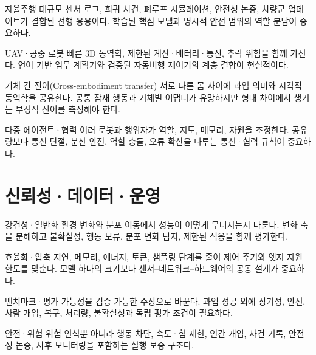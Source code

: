 \documentclass[11pt,openany]{book}
\begin{document}
\begin{termcard}{자율주행}
대규모 센서 로그, 희귀 사건, 폐루프 시뮬레이션, 안전성 논증, 차량군 업데이트가 결합된 선행 응용이다. 학습된 핵심 모델과 명시적 안전 범위의 역할 분담이 중요하다.
\end{termcard}

\begin{termcard}{UAV·공중 로봇}
빠른 3D 동역학, 제한된 계산·배터리·통신, 추락 위험을 함께 가진다. 언어 기반 임무 계획기와 검증된 자동비행 제어기의 계층 결합이 현실적이다.
\end{termcard}

\begin{termcard}{기체 간 전이(Cross-embodiment transfer)}
서로 다른 몸 사이에 과업 의미와 시각적 동역학을 공유한다. 공통 잠재 행동과 기체별 어댑터가 유망하지만 형태 차이에서 생기는 부정적 전이를 측정해야 한다.
\end{termcard}

\begin{termcard}{다중 에이전트·협력}
여러 로봇과 행위자가 역할, 지도, 메모리, 자원을 조정한다. 공유량보다 통신 단절, 분산 안전, 역할 충돌, 오류 확산을 다루는 통신·협력 규칙이 중요하다.
\end{termcard}

\chapter*{신뢰성·데이터·운영}

\begin{termcard}{강건성·일반화}
환경 변화와 분포 이동에서 성능이 어떻게 무너지는지 다룬다. 변화 축을 분해하고 불확실성, 행동 보류, 분포 변화 탐지, 제한된 적응을 함께 평가한다.
\end{termcard}

\begin{termcard}{효율화·압축}
지연, 메모리, 에너지, 토큰, 샘플링 단계를 줄여 제어 주기와 엣지 자원 한도를 맞춘다. 모델 하나의 크기보다 센서--네트워크--하드웨어의 공동 설계가 중요하다.
\end{termcard}

\begin{termcard}{벤치마크·평가}
가능성을 검증 가능한 주장으로 바꾼다. 과업 성공 외에 장기성, 안전, 사람 개입, 복구, 처리량, 불확실성과 독립 평가 조건이 필요하다.
\end{termcard}

\begin{termcard}{안전·위험}
위험 인식뿐 아니라 행동 차단, 속도·힘 제한, 인간 개입, 사건 기록, 안전성 논증, 사후 모니터링을 포함하는 실행 보증 구조다.
\end{termcard}
\end{document}
